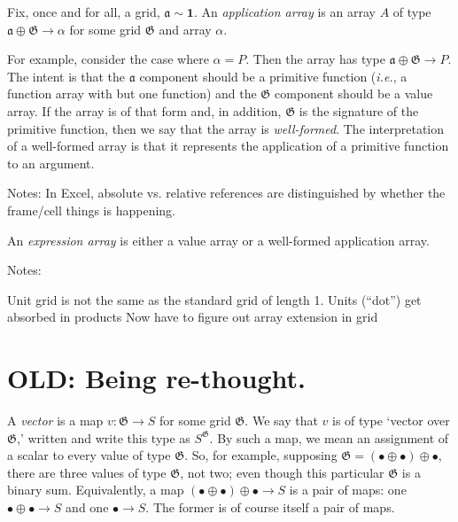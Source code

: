 \documentclass[11pt]{article}
\newcommand{\gr}[1]{\mathfrak{#1}}
\newcommand{\GG}{\gr{G}}
\newcommand{\unit}{\bullet}
\begin{document}
Fix, once and for all, a grid, $\gr{a} \sim \mathbf{1}$. An \emph{application
array} is an array $A$ of type $\gr{a}\oplus\gr{G} \to \alpha$ for some grid
$\gr{G}$ and array $\alpha$. 

For example, consider the case where $\alpha = P$. Then the array has type
$\gr{a}\oplus\gr{G} \to P$. The intent is that the $\gr{a}$ component should be a
primitive function (\emph{i.e.}, a function array with but one function) and the
$\gr{G}$ component should be a value array. If the array is of that form and, in
addition, $\gr{G}$ is the signature of the primitive function, then we say that
the array is \emph{well-formed}. The interpretation of a well-formed array is
that it represents the application of a primitive function to an argument.



Notes: In Excel, absolute vs. relative references are distinguished by whether
the frame/cell things is happening.





An \emph{expression array} is either a value array or a well-formed application
array.

Notes:

Unit grid is not the same as the standard grid of length 1.
Units (``dot'') get absorbed in products
Now have to figure out array extension in grid

                                                                                                   







\section{OLD: Being re-thought.}
\label{sec:org0f361a3}


A \emph{vector} is a map \(v : \GG\to S\) for some grid \(\GG\). We say that \(v\) is of
type ‘vector over \(\GG\),’ written and write this type as \(S^\GG\). By such a map,
we mean an assignment of a scalar to every value of type \(\GG\). So, for example,
supposing \(\GG = (\unit\oplus\unit) \oplus \unit\), there are three values of
type \(\GG\), not two; even though this particular \(\GG\) is a binary
sum. Equivalently, a map \((\unit\oplus\unit) \oplus \unit\to S\) is a pair of
maps: one \(\unit\oplus\unit\to S\) and one \(\unit\to S\). The former is of course
itself a pair of maps.
\end{document}
